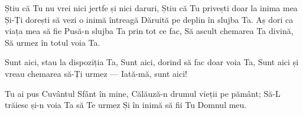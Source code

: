 \beginverse
Știu că Tu nu vrei nici jertfe și nici daruri,
Știu că Tu privești doar la inima mea
Și-Ți dorești să vezi o inimă întreagă
Dăruită pe deplin în slujba Ta.
Aș dori ca viața mea să fie
Pusă-n slujba Ta prin tot ce fac,
Să ascult chemarea Ta divină,
Să urmez în totul voia Ta.
\endverse

\beginchorus
Sunt aici, stau la dispoziția Ta,
Sunt aici, dorind să fac doar voia Ta,
Sunt aici și vreau chemarea să-Ți urmez —
Iată-mă, sunt aici!
\endchorus

\beginverse
Tu ai pus Cuvântul Sfânt în mine,
Călăuză-n drumul vieții pe pământ;
Să-L trăiesc și-n voia Ta să Te urmez
Și în inimă să fii Tu Domnul meu.
\endverse
\endsong